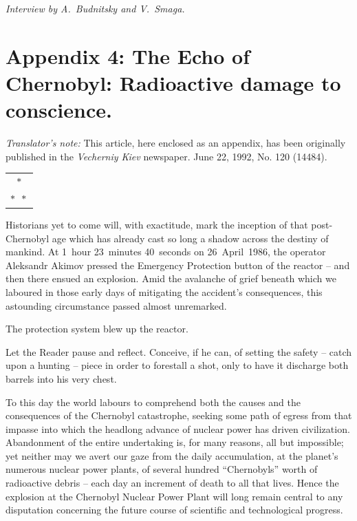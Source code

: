 \documentclass[openright]{bookest}
\newcommand{\varthreestars}{\begin{center}\begin{tabular}{c}$\ast$\\[-0.8ex] $\ast\enspace \ast $\end{tabular}\end{center}}
\begin{document}
\medskip

\begin{flushright}
\textit{Interview by A.~Budnitsky and V.~Smaga.}
\end{flushright}

\chapter*{Appendix 4: The Echo of Chernobyl: Radioactive damage to conscience.}

\textit{Translator's note:} This article, here enclosed as an appendix, has been originally published in the \textit{Vecherniy Kiev} newspaper. June 22, 1992, No. 120 (14484).

\varthreestars

Historians yet to come will, with exactitude, mark the inception of that post-Chernobyl age which has already cast so long a shadow across the destiny of mankind. At 1~hour 23~minutes 40~seconds on 26~April~1986, the operator Aleksandr Akimov pressed the Emergency Protection button of the reactor -- and then there ensued an explosion. Amid the avalanche of grief beneath which we laboured in those early days of mitigating the accident's consequences, this astounding circumstance passed almost unremarked.

The protection system blew up the reactor.

Let the Reader pause and reflect. Conceive, if he can, of setting the safety -- catch upon a hunting -- piece in order to forestall a shot, only to have it discharge both barrels into his very chest.

To this day the world labours to comprehend both the causes and the consequences of the Chernobyl catastrophe, seeking some path of egress from that impasse into which the headlong advance of nuclear power has driven civilization. Abandonment of the entire undertaking is, for many reasons, all but impossible; yet neither may we avert our gaze from the daily accumulation, at the planet's numerous nuclear power plants, of several hundred ``Chernobyls'' worth of radioactive debris -- each day an increment of death to all that lives. Hence the explosion at the Chernobyl Nuclear Power Plant will long remain central to any disputation concerning the future course of scientific and technological progress.
\end{document}
